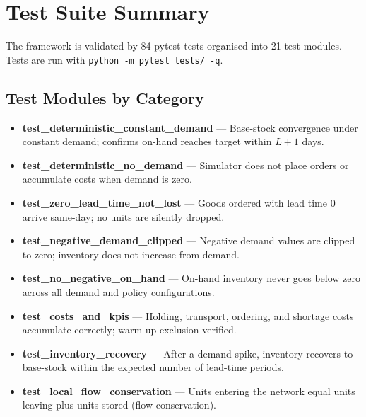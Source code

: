 \chapter{Test Suite Summary}
\label{appn:tests}

The framework is validated by 84 pytest tests organised
into 21 test modules.  Tests are run with \texttt{python -m pytest tests/ -q}.

\section*{Test Modules by Category}

\begin{itemize}
  \item \textbf{test\_deterministic\_constant\_demand} ---
        Base-stock convergence under constant demand; confirms on-hand
        reaches target within $L+1$ days.

  \item \textbf{test\_deterministic\_no\_demand} ---
        Simulator does not place orders or accumulate costs when demand
        is zero.

  \item \textbf{test\_zero\_lead\_time\_not\_lost} ---
        Goods ordered with lead time 0 arrive same-day; no units are
        silently dropped.

  \item \textbf{test\_negative\_demand\_clipped} ---
        Negative demand values are clipped to zero; inventory does not
        increase from demand.

  \item \textbf{test\_no\_negative\_on\_hand} ---
        On-hand inventory never goes below zero across all demand and
        policy configurations.

  \item \textbf{test\_costs\_and\_kpis} ---
        Holding, transport, ordering, and shortage costs accumulate
        correctly; warm-up exclusion verified.

  \item \textbf{test\_inventory\_recovery} ---
        After a demand spike, inventory recovers to base-stock within
        the expected number of lead-time periods.

  \item \textbf{test\_local\_flow\_conservation} ---
        Units entering the network equal units leaving plus units stored
        (flow conservation).


\end{itemize}
